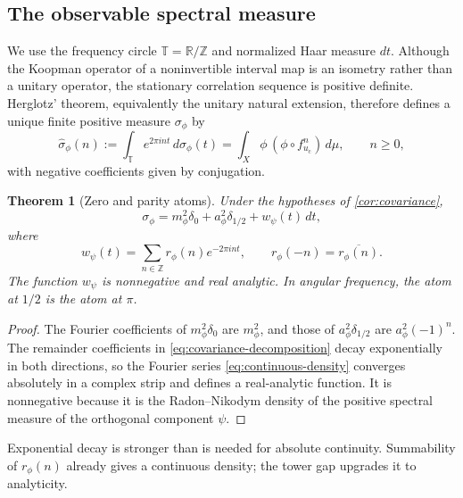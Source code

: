 \documentclass[11pt]{article}
\newtheorem{theorem}{Theorem}[section]
\theoremstyle{definition}
\theoremstyle{remark}
\newcommand{\R}{\mathbb R}
\newcommand{\T}{\mathbb T}
\newcommand{\uc}{u_{\mathrm c}}
\begin{document}
\subsection{The observable spectral measure}

We use the frequency circle $\T=\R/\mathbb Z$ and normalized Haar measure $dt$.  Although the Koopman operator of a noninvertible interval map is an isometry rather than a unitary operator, the stationary correlation sequence is positive definite.  Herglotz' theorem, equivalently the unitary natural extension, therefore defines a unique finite positive measure $\sigma_\phi$ by
\begin{equation}\label{eq:spectral-measure-definition}
    \widehat\sigma_\phi(n)
    :=\int_{\T}e^{2\pi i nt}\,d\sigma_\phi(t)
    =\int_X\phi\,(\phi\circ f_{\uc}^n)\,d\mu,
    \qquad n\ge0,
\end{equation}
with negative coefficients given by conjugation.

\begin{theorem}[Zero and parity atoms]\label{thm:spectral-measure}
Under the hypotheses of \cref{cor:covariance},
\begin{equation}\label{eq:spectral-decomposition}
    \sigma_\phi
    =m_\phi^2\delta_0+a_\phi^2\delta_{1/2}
      +w_\psi(t)\,dt,
\end{equation}
where
\begin{equation}\label{eq:continuous-density}
    w_\psi(t)=\sum_{n\in\mathbb Z}r_\phi(n)e^{-2\pi i nt},
    \qquad r_\phi(-n)=\overline{r_\phi(n)}.
\end{equation}
The function $w_\psi$ is nonnegative and real analytic.  In angular frequency, the atom at $1/2$ is the atom at $\pi$.
\end{theorem}

\begin{proof}
The Fourier coefficients of $m_\phi^2\delta_0$ are $m_\phi^2$, and those of $a_\phi^2\delta_{1/2}$ are $a_\phi^2(-1)^n$.  The remainder coefficients in \eqref{eq:covariance-decomposition} decay exponentially in both directions, so the Fourier series \eqref{eq:continuous-density} converges absolutely in a complex strip and defines a real-analytic function.  It is nonnegative because it is the Radon--Nikodym density of the positive spectral measure of the orthogonal component $\psi$.
\end{proof}

Exponential decay is stronger than is needed for absolute continuity.  Summability of $r_\phi(n)$ already gives a continuous density; the tower gap upgrades it to analyticity.
\end{document}
